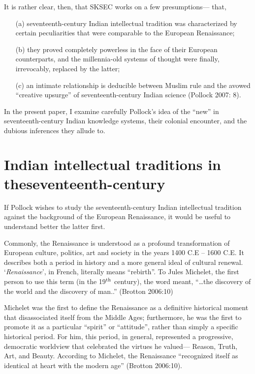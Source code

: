 It is rather clear, then, that SKSEC works on a few presumptions— that, 
\begin{itemize}
\itemsep=1pt
\item[(a)] seventeenth-century Indian intellectual tradition was characterized by certain peculiarities that were comparable to the European Renaissance;

\item[(b)] they proved completely powerless in the face of their European counterparts, and the millennia-old systems of thought were finally, irrevocably, replaced by the latter; 

\item[(c)] an intimate relationship is deducible between Muslim rule and the avowed “creative upsurge” of seventeenth-century Indian science (Pollock 2007: 8).
\end{itemize}

In the present paper, I examine carefully Pollock’s idea of the “new” in seventeenth-century Indian knowledge systems, their colonial encounter, and the dubious inferences they allude to.

\newpage

\section{Indian intellectual traditions in the\newline seventeenth-century}

If Pollock wishes to study the seventeenth-century Indian intellectual tradition against the background of the European Renaissance, it would be useful to understand better the latter first. 

Commonly, the Renaissance is understood as a profound transformation of European culture, politics, art and society in the years 1400 C.E – 1600 C.E.  It describes both a period in history and a more general ideal of cultural renewal. ‘{\em Renaissance}’, in French, literally means “rebirth”. To Jules Michelet, the first person to use this term (in the 19$^{\rm th}$ century), the word meant, “…the discovery of the world and the discovery of man..” (Brotton 2006:10) 

Michelet was the first to define the Renaissance as a definitive historical moment that disassociated itself from the Middle Ages; furthermore, he was the first to promote it as a particular “spirit” or “attitude”, rather than simply a specific historical period. For him, this period, in general, represented a progressive, democratic worldview that celebrated the virtues he valued— Reason, Truth, Art, and Beauty. According to Michelet, the Renaissance “recognized itself as identical at heart with the modern age” (Brotton 2006:10).

